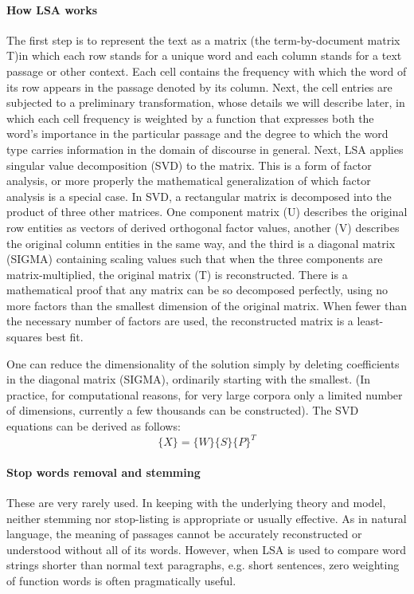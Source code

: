 \paragraph{How LSA works}
The first step is to represent the text as a matrix (the term-by-document matrix T)in which each row stands for a unique word and each column stands for a text passage or other context. Each cell contains the frequency with which the word of its row appears in the passage denoted by its column. Next, the cell entries are subjected to a preliminary transformation, whose details we will describe later, in which each cell frequency is weighted by a function that expresses both the word's importance in the particular passage and the degree to which the word type carries information in the domain of discourse in general.
Next, LSA applies singular value decomposition (SVD) to the matrix. This is a form of factor analysis, or more properly the mathematical generalization of which factor analysis is a special case. In SVD, a rectangular matrix is decomposed into the product of three other matrices. One component matrix (U) describes the original row entities as vectors of derived orthogonal factor values, another (V) describes the original column entities in the same way, and the third is a diagonal matrix (SIGMA) containing scaling values such that when the three components are matrix-multiplied, the original matrix (T) is reconstructed. 
There is a mathematical proof that any matrix can be so decomposed perfectly, using no more factors than the smallest dimension of the original matrix. When fewer than the necessary number of factors are used, the reconstructed matrix is a least-squares best fit. 

One can reduce the dimensionality of the solution simply by deleting coefficients in the diagonal matrix (SIGMA), ordinarily starting with the smallest. (In practice, for computational reasons, for very large corpora only a limited number of dimensions, currently a few thousands can be constructed). The SVD equations can be derived as follows\citep{lsa}:\\
\begin{equation}
\{X\} = \{W\}\{S\}\{P\}^T
\end{equation}

\paragraph{Stop words removal and stemming}
These are very rarely used. In keeping with the underlying theory and model, neither stemming nor stop-listing is appropriate or usually effective. As in natural language, the meaning of passages cannot be accurately reconstructed or understood without all of its words. However, when LSA is used to compare word strings shorter than normal text paragraphs, e.g. short sentences, zero weighting of function words is often pragmatically useful.
